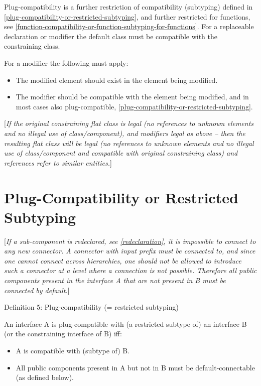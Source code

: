 Plug-compatibility is a further restriction of compatibility (subtyping)
defined in \ref{plug-compatibility-or-restricted-subtyping}, and further restricted for functions, see
\ref{function-compatibility-or-function-subtyping-for-functions}. For a replaceable declaration or modifier the default class
must be compatible with the constraining class.

For a modifier the following must apply:

\begin{itemize}
\item
  The modified element should exist in the element being modified.
\item
  The modifier should be compatible with the element being modified, and
  in most cases also plug-compatible, \ref{plug-compatibility-or-restricted-subtyping}.
\end{itemize}

{[}\emph{If the original constraining flat class is legal (no references
to unknown elements and no illegal use of class/component), and
modifiers legal as above -- then the resulting flat class will be legal
(no references to unknown elements and no illegal use of class/component
and compatible with original constraining class) and references refer to
similar entities.}{]}

\section{Plug-Compatibility or Restricted Subtyping}

{[}\emph{If a sub-component is redeclared, see \ref{redeclaration}, it is
impossible to connect to any new connector. A connector with input
prefix must be connected to, and since one cannot connect across
hierarchies, one should not be allowed to introduce such a connector at
a level where a connection is not possible. Therefore all public
components present in the interface A that are not present in B must be
connected by default.}{]}

Definition 5: Plug-compatibility (= restricted subtyping)

An interface A is plug-compatible with (a restricted subtype of) an
interface B (or the constraining interface of B) iff:

\begin{itemize}
\item
  A is compatible with (subtype of) B.
\item
  All public components present in A but not in B must be
  default-connectable (as defined below).
\end{itemize}


